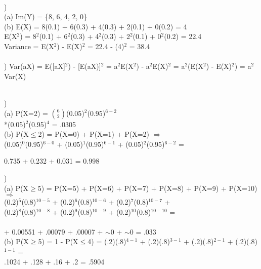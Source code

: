 \documentclass[12pt]{article}
\begin{document}
\noindent \hrulefill \\


)\\
\indent (a) Im(Y) = \{8, 6, 4, 2, 0\}\\

\indent (b) E(X) = 8(0.1) + 6(0.3) + 4(0.3) + 2(0.1) + 0(0.2) = 4\\[.4em]
\indent \indent E(X$^2$) = 8$^2$(0.1) + 6$^2$(0.3) + 4$^2$(0.3) + 2$^2$(0.1) + 0$^2$(0.2) = 22.4\\[.4em]
\indent \indent Variance = E(X$^2$) - E(X)$^2$ = 22.4 - (4)$^2$ = 38.4\\


\noindent \hrulefill \\


) Var(aX) = E([aX]$^2$) - [E(aX)]$^2$ = a$^2$E(X$^2$) - a$^2$E(X)$^2$ = a$^2$(E(X$^2$) - E(X)$^2$) =  a$^2$Var(X)


\noindent \hrulefill \\


) \\ 
\indent (a) P(X=2) = {\Large$\binom{6}{2}$}(0.05)$^2$(0.95)$^{6-2}$\\[.4em]
\indent {}*(0.05)$^2$(0.95)$^{4}$ = .0305\\

\indent (b) P(X$\le$2) = P(X=0) + P(X=1) + P(X=2) $\Rightarrow$\\[.4em]
\indent {}(0.05)$^0$(0.95)$^{6-0}$ +
(0.05)$^1$(0.95)$^{6-1}$ +
(0.05)$^2$(0.95)$^{6-2}$ =\\[.4em]
\centerline{ 0.735 + 0.232 + 0.031 = 0.998 }


\noindent \hrulefill 
\pagebreak


)\\
\indent (a) P(X$\ge$5) = P(X=5) + P(X=6) + P(X=7) + P(X=8) + P(X=9) + P(X=10) $\Rightarrow$\\[.4em]
\indent {}(0.2)$^{5}$(0.8)$^{10-5}$ +
(0.2)$^{6}$(0.8)$^{10-6}$ +
(0.2)$^{7}$(0.8)$^{10-7}$ +\\[.4em]
\indent {}(0.2)$^{8}$(0.8)$^{10-8}$ +
(0.2)$^{9}$(0.8)$^{10-9}$ +
(0.2)$^{10}$(0.8)$^{10-10}$ =\\\\
\indent {} + 0.00551 + .00079 + .00007 + $\sim$0 + $\sim$0 = .033\\

\indent (b) P(X$\ge$5) = 1 - P(X$\le$4) = (.2)(.8)$^{4-1}$ + (.2)(.8)$^{3-1}$ + (.2)(.8)$^{2-1}$ + (.2)(.8)$^{1-1}$ =\\[.4em]
\indent \indent .1024 + .128 + .16 + .2 = .5904
\end{document}

